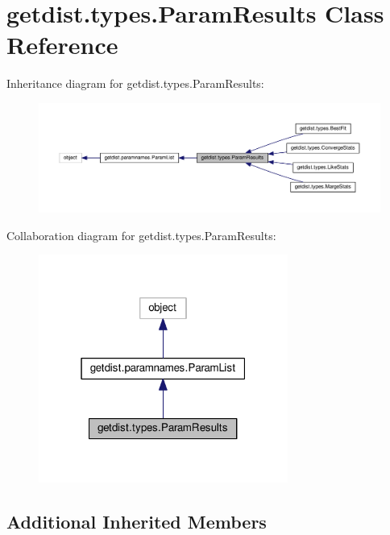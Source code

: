 \hypertarget{classgetdist_1_1types_1_1ParamResults}{}\section{getdist.\+types.\+Param\+Results Class Reference}
\label{classgetdist_1_1types_1_1ParamResults}


Inheritance diagram for getdist.\+types.\+Param\+Results\+:
\nopagebreak
\begin{figure}[H]
\begin{center}
\leavevmode
\includegraphics[width=350pt]{classgetdist_1_1types_1_1ParamResults__inherit__graph}
\end{center}
\end{figure}


Collaboration diagram for getdist.\+types.\+Param\+Results\+:
\nopagebreak
\begin{figure}[H]
\begin{center}
\leavevmode
\includegraphics[width=232pt]{classgetdist_1_1types_1_1ParamResults__coll__graph}
\end{center}
\end{figure}
\subsection*{Additional Inherited Members}


